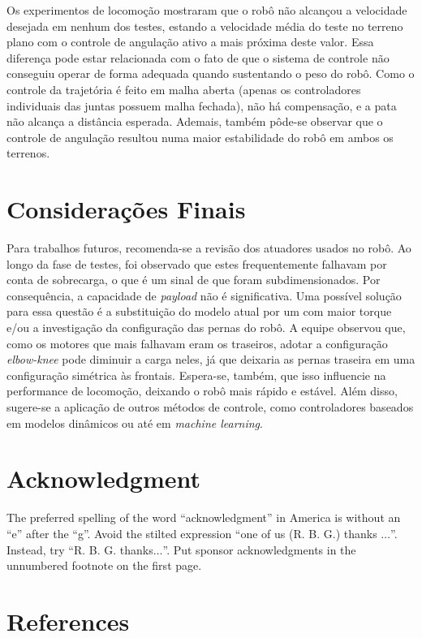 \documentclass[conference]{IEEEtran}
\begin{document}
Os experimentos de locomoção mostraram que o robô não alcançou a velocidade desejada em nenhum dos testes, estando  a velocidade média do teste no terreno plano com o controle de angulação ativo a mais próxima deste valor. Essa diferença pode estar relacionada com o fato de que o sistema de controle não conseguiu operar de forma adequada quando sustentando o peso do robô. Como o controle da trajetória é feito em malha aberta (apenas os controladores individuais das juntas possuem malha fechada), não há compensação, e a pata não alcança a distância esperada. Ademais, também pôde-se observar que o controle de angulação resultou numa maior estabilidade do robô em ambos os terrenos.

\section{Considerações Finais}

Para trabalhos futuros, recomenda-se a revisão dos atuadores usados no robô. Ao longo da fase de testes, foi observado que estes frequentemente falhavam por conta de sobrecarga, o que é um sinal de que foram subdimensionados. Por consequência, a capacidade de \textit{payload} não é significativa. Uma possível solução para essa questão é a substituição do modelo atual por um com maior torque e/ou a investigação da configuração das pernas do robô. A equipe observou que, como os motores que mais falhavam eram os traseiros, adotar a configuração \textit{elbow-knee} pode diminuir a carga neles, já que deixaria as pernas traseira em uma configuração simétrica às frontais. Espera-se, também, que isso influencie na performance de locomoção, deixando o robô mais rápido e estável. Além disso, sugere-se a aplicação de outros métodos de controle, como controladores baseados em modelos dinâmicos ou até em \textit{machine learning}.


\section*{Acknowledgment}

The preferred spelling of the word ``acknowledgment'' in America is without 
an ``e'' after the ``g''. Avoid the stilted expression ``one of us (R. B. 
G.) thanks $\ldots$''. Instead, try ``R. B. G. thanks$\ldots$''. Put sponsor 
acknowledgments in the unnumbered footnote on the first page.

\section*{References}
\end{document}
